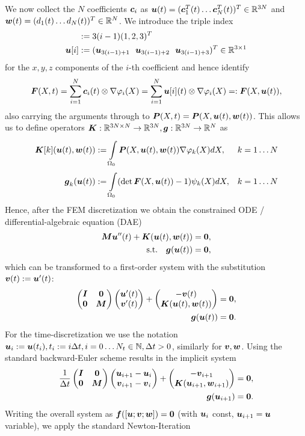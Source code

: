 We now collect the $N$ coefficients $\vc_i$ as $\vu(t) = (\vc_1^T(t) \ldots \vc_N^T(t))^T \in\R^{3N}$
and $\vw(t) = (d_1(t) \ldots d_N(t))^T \in\R^N$.
We introduce the triple index
\begin{align}
	[i] &:= 3(i-1)(1, 2, 3)^T\\
	\vu[i] &:= (\vu_{3(i-1)+1}~~\vu_{3(i-1)+2}~~\vu_{3(i-1)+3})^T\in\R^{3\times 1}
\end{align}
for the $x,y,z$ components of the $i$-th coefficient and hence identify
\[
	\vF(X,t) = \sumi \vc_i(t)\otimes \nabla\varphi_i(X) = \sumi \vu[i](t)\otimes \nabla\varphi_i(X) =: \vF(X,\vu(t)),
\]
also carrying the arguments through to $\vP(X,t) = \vP(X,\vu(t),\vw(t))$.
This allows us to define operators $\vK: \R^{3N\times N}\to\R^{3N}, \vg:\R^{3N}\to\R^N$ as
\begin{align}
	\vK[k](\vu(t),\vw(t)) &:= \intor\vP(X,\vu(t),\vw(t))\dpk dX, && k=1\ldots N\\
	\vg_k(\vu(t)) &:= \intor (\det\vF(X,\vu(t))-1)\psi_k(X)dX, && k=1\ldots N
\end{align}
Hence, after the FEM discretization we obtain the constrained ODE / differential-algebraic equation (DAE)
\begin{align}
	\vM\vu''(t) + \vK(\vu(t),\vw(t)) &= \vnull,\\
		\text{s.t.}\quad \vg(\vu(t))		&= \vnull,
\end{align}
which can be transformed to a first-order system with the substitution $\vv(t) := \vu'(t)$:
\begin{align}
	\m{\vI & \vnull\\ \vnull & \vM}\m{\vu'(t)\\ \vv'(t)} + \m{-\vv(t) \\ \vK(\vu(t),\vw(t))} &= \vnull,\\
	\vg(\vu(t))		&= \vnull.
\end{align}
For the time-discretization we use the notation $\vu_i := \vu(t_i), t_i := i\Delta t, i=0\ldots N_t\in\N, \Delta t > 0$, similarly for $\vv,\vw$.
Using the standard backward-Euler scheme results in the implicit system
\begin{align}
	\frac{1}{\Delta t}\m{\vI & \vnull\\ \vnull & \vM}\m{\vu_{i+1}-\vu_i\\\vv_{i+1}-\vv_i} + \m{- \vv_{i+1}\\\vK(\vu_{i+1},\vw_{i+1})} &= \vnull,\\
	\vg(\vu_{i+1})		&= \vnull.
\end{align}
Writing the overall system as $\vf([\vu; \vv; \vw]) = \vnull$ (with $\vu_i$ const, $\vu_{i+1}=\vu$ variable), we apply the standard Newton-Iteration
